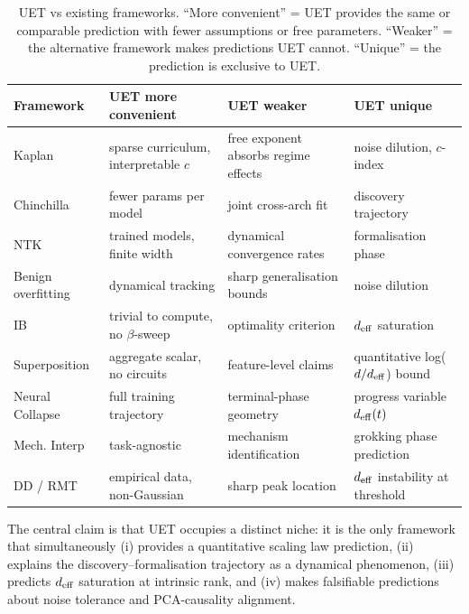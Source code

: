 \begin{table}[H]
\centering\small
\begin{tabular}{lp{3.8cm}p{3.8cm}l}
\toprule
Framework & UET more convenient & UET weaker & UET unique \\
\midrule
Kaplan       & sparse curriculum, interpretable $c$ & free exponent absorbs regime effects & noise dilution, $c$-index \\
Chinchilla   & fewer params per model & joint cross-arch fit & discovery trajectory \\
NTK          & trained models, finite width & dynamical convergence rates & formalisation phase \\
Benign overfitting & dynamical tracking & sharp generalisation bounds & noise dilution \\
IB           & trivial to compute, no $\beta$-sweep & optimality criterion & $d_{\mathrm{eff}}$ saturation \\
Superposition & aggregate scalar, no circuits & feature-level claims & quantitative log($d/d_{\mathrm{eff}}$) bound \\
Neural Collapse & full training trajectory & terminal-phase geometry & progress variable $d_{\mathrm{eff}}(t)$ \\
Mech. Interp & task-agnostic & mechanism identification & grokking phase prediction \\
DD / RMT     & empirical data, non-Gaussian & sharp peak location & $d_{\mathrm{eff}}$ instability at threshold \\
\bottomrule
\end{tabular}
\caption{UET vs existing frameworks. ``More convenient'' = UET provides the
same or comparable prediction with fewer assumptions or free parameters.
``Weaker'' = the alternative framework makes predictions UET cannot.
``Unique'' = the prediction is exclusive to UET.}
\label{tab:cross-theory}
\end{table}

\vspace{0.5em}
The central claim is that UET occupies a distinct niche: it is the only framework
that simultaneously (i) provides a quantitative scaling law prediction,
(ii) explains the discovery--formalisation trajectory as a dynamical phenomenon,
(iii) predicts $d_{\mathrm{eff}}$ saturation at intrinsic rank, and
(iv) makes falsifiable predictions about noise tolerance and PCA-causality alignment.
